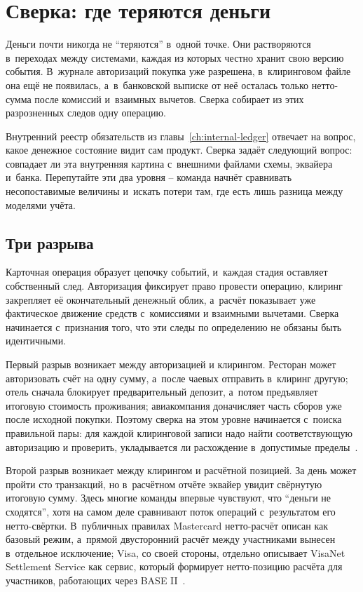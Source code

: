 
\chapter{Сверка: где теряются деньги}\label{ch:reconciliation}

Деньги почти никогда не \enquote{теряются} в~одной точке.
Они растворяются в~переходах между системами, каждая из которых
честно хранит свою версию события. В~журнале авторизаций покупка уже
разрешена, в~клиринговом файле она ещё не появилась, а~в~банковской
выписке от неё осталась только нетто-сумма после комиссий и~взаимных
вычетов. Сверка собирает из этих разрозненных следов одну операцию.

Внутренний реестр обязательств из главы~\ref{ch:internal-ledger}
отвечает на вопрос, какое денежное состояние видит сам продукт.
Сверка задаёт следующий вопрос: совпадает ли эта внутренняя картина
с~внешними файлами схемы, эквайера и~банка. Перепутайте эти два уровня
-- команда начнёт сравнивать несопоставимые величины и~искать
потери там, где есть лишь разница между моделями учёта.

\section{Три разрыва}\label{sec:recon-gaps}

Карточная операция образует цепочку событий, и~каждая стадия
оставляет собственный след. Авторизация фиксирует право провести операцию,
клиринг закрепляет её окончательный денежный облик, а~расчёт показывает
уже фактическое движение средств с~комиссиями и взаимными вычетами.
Сверка начинается с~признания того, что эти следы по определению не обязаны
быть идентичными.

Первый разрыв возникает между авторизацией и клирингом. Ресторан может
авторизовать счёт на одну сумму, а~после чаевых отправить в~клиринг
другую; отель сначала блокирует предварительный депозит, а~потом
предъявляет итоговую стоимость проживания; авиакомпания доначисляет
часть сборов уже после исходной покупки. Поэтому сверка на этом уровне
начинается с~поиска правильной
пары: для каждой клиринговой записи надо найти соответствующую
авторизацию и проверить, укладывается ли расхождение в~допустимые
пределы~\cite{visa-tadg,mc-tpr}.

Второй разрыв возникает между клирингом и расчётной позицией. За день
может пройти сто транзакций, но в~расчётном отчёте эквайер увидит
свёрнутую итоговую сумму. Здесь многие команды впервые чувствуют, что
\enquote{деньги не сходятся}, хотя на самом деле сравнивают поток
операций с~результатом его нетто-свёртки. В~публичных правилах Mastercard нетто-расчёт описан как
базовый режим, а~прямой двусторонний расчёт между участниками вынесен
в~отдельное
исключение; Visa, со своей стороны, отдельно описывает VisaNet
Settlement Service как сервис, который формирует нетто-позицию расчёта
для участников, работающих через BASE II~\cite{mc-rules,visa-core-rules}.

